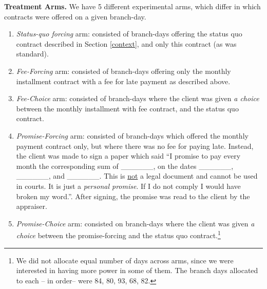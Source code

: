 \documentclass[11pt]{article}
\begin{document}
\vspace{.2in}
\noindent \textbf{Treatment Arms.} We have 5 different experimental arms, which differ in which contracts were offered on a given branch-day. 

\begin{enumerate}
    \item \textit{Status-quo forcing} arm: consisted of branch-days offering the status quo contract described in Section \ref{context}, and only this contract (as was standard). 
    \item \textit{Fee-Forcing} arm: consisted of branch-days offering only the monthly installment contract with a fee for late payment as described above. 
    \item \textit{Fee-Choice} arm: consisted of branch-days where the client was given \textit{a choice} between the monthly installment with fee contract, and the status quo contract.
    \item \textit{Promise-Forcing} arm: consisted of branch-days which offered the monthly payment contract only, but where there was no fee for paying late. Instead, the client was made to sign a paper which said ``I promise to pay every month the corresponding sum of \_\_\_\_\_\_, on the dates \_\_\_\_\_\_, \_\_\_\_\_\_, and \_\_\_\_\_\_. This is \underline{not} a legal document and cannot be used in courts. It is just a \textit{personal promise}. If I do not comply I would have broken my word.''. After signing, the promise was read to the client by the appraiser.
    \item \textit{Promise-Choice} arm: consisted on branch-days where the client was given \textit{a choice} between the promise-forcing and the status quo contract.\footnote{We did not allocate equal number of days across arms, since we were interested in having more power in some of them. The branch days allocated to each -- in order-- were 84, 80, 93, 68, 82.}
\end{enumerate}
\end{document}
